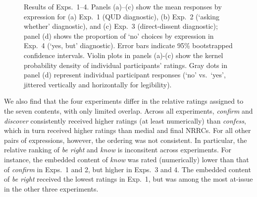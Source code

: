 \documentclass[times,linguex,xcolor]{glossa}
\begin{document}
\begin{figure}[h!]
      \hfill
    \caption{Results of Exps.~1--4.
      Panels (a)--(c) show the mean responses by expression for (a) Exp.~1 (QUD diagnostic),  (b) Exp.~2 (`asking whether' diagnostic), and (c) Exp.~3 (direct-dissent diagnostic); panel (d) shows the proportion of `no' choices by expression in Exp.~4 (`yes, but' diagnostic). Error bars indicate 95\% bootstrapped confidence intervals. Violin plots in panels (a)-(c) show the kernel probability density of individual participants' ratings. Gray dots in panel (d) represent individual participant responses (`no' vs.\ `yes', jittered vertically and horizontally for legibility).}
    \label{fig:results}
    \end{figure}

    We also find that the four experiments differ in the relative ratings assigned to the seven contents, with only limited overlap. Across all experiments, \emph{confirm} and \emph{discover} consistently received higher ratings (at least numerically) than \emph{confess}, which in turn received higher ratings than medial and final NRRCs. For all other pairs of expressions, however, the ordering was not consistent. In particular, the relative ranking of \emph{be right} and \emph{know} is inconsitent across experiments. For instance, the embedded content of \emph{know} was rated (numerically) lower than that of \emph{confirm} in Exps.~1 and 2, but higher in Exps.~3 and 4. The embedded content of \emph{be right} received the lowest ratings in Exp.~1, but was among the most at-issue in the other three experiments.
\end{document}

